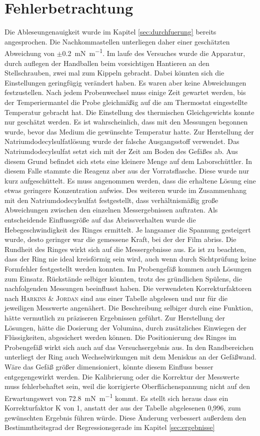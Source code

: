 \newpage
\section{Fehlerbetrachtung}
\label{sec:fehler}
Die Ableseungenauigkeit wurde im Kapitel \ref{sec:durchfuerung} bereits angesprochen. Die Nachkommastellen unterliegen daher einer geschätzten Abweichung von $\pm$\SI{0,2}{\milli\newton\per\meter}. Im laufe des Versuches wurde die Apparatur, durch auflegen der Handballen beim vorsichtigen Hantieren an den Stellschrauben, zwei  mal zum Kippeln gebracht. Dabei könnten sich die Einstellungen geringfügig verändert haben. Es waren aber keine Abweichungen festzustellen. Nach jedem Probenwechsel muss einige Zeit gewartet werden, bis der Temperiermantel die Probe gleichmäßig auf die am Thermostat eingestellte Temperatur gebracht hat. Die Einstellung des thermischen Gleichgewichts konnte nur geschätzt werden. Es ist wahrscheinlich, dass mit den Messungen begonnen wurde, bevor das Medium die gewünschte Temperatur hatte. Zur Herstellung der Natriumdodecylsulfatlösung wurde der falsche Ausgangsstoff verwendet. Das Natriumdodecylsulfat setzt sich mit der Zeit am Boden des Gefäßes ab. Aus diesem Grund befindet sich stets eine kleinere Menge auf dem Laborschüttler. In diesem Falle stammte die Reagenz aber aus der Vorratsflasche. Diese wurde nur kurz aufgeschüttelt. Es muss angenommen werden, dass die erhaltene Lösung eine etwas geringere Konzentration aufwies. Des weiteren wurde im Zusammenhang mit den Natriumdodecylsulfat festgestellt, dass verhältnismäßig große Abweichungen zwischen den einzelnen Messergebnissen auftraten. Als entscheidende Einflussgröße auf das Abrissverhalten wurde die Hebegeschwindigkeit des Ringes ermittelt. Je langsamer die Spannung gesteigert wurde, desto geringer war die gemessene Kraft, bei der der Film abriss. Die Rundheit des Ringes wirkt sich auf die Messergebnisse aus. Es ist zu beachten, dass der Ring nie ideal kreisförmig sein wird, auch wenn durch Sichtprüfung keine Formfehler festgestellt werden konnten. Im Probengefäß kommen auch Lösungen zum Einsatz. Rückstände selbiger könnten, trotz des gründlichen Spülens, die nachfolgenden Messungen beeinflusst haben. Die verwendeten Korrekturfaktoren nach \textsc{Harkins \& Jordan} sind aus einer Tabelle abgelesen und nur für die jeweiligen Messwerte angenähert. Die Beschreibung selbiger durch eine Funktion, hätte vermutlich zu präziseren Ergebnissen geführt. Zur Herstellung der Lösungen, hätte die Dosierung der Volumina, durch zusätzliches Einwiegen der Flüssigkeiten, abgesichert werden können. Die Positionierung des Ringes im Probengefäß wirkt sich auch auf das Versuchsergebnis aus. In den Randbereichen unterliegt der Ring auch Wechselwirkungen mit dem Meniskus an der Gefäßwand. Wäre das Gefäß größer dimensioniert, könnte diesem Einfluss besser entgegengewirkt werden.
Die Kalibrierung oder die Korrektur der Messwerte muss fehlerbehaftet sein, weil die korrigierte Oberflächenspannung nicht auf den Erwartungswert von \SI{72,8}{\milli\newton\per\meter} kommt. Es stellt sich heraus dass ein Korrekturfaktor K von 1, anstatt der aus der Tabelle abgelesenen 0,996, zum gewünschten Ergebnis führen würde. Diese Änderung verbessert außerdem den Bestimmtheitsgrad der Regressionsgerade im Kapitel \ref{sec:ergebnisse} 
